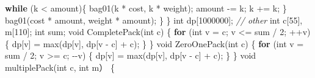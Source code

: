 \documentclass[
]{article}
\newenvironment{Shaded}{}{}
\newcommand{\CommentTok}[1]{\textcolor[rgb]{0.38,0.63,0.69}{\textit{#1}}}
\newcommand{\ControlFlowTok}[1]{\textcolor[rgb]{0.00,0.44,0.13}{\textbf{#1}}}
\newcommand{\DataTypeTok}[1]{\textcolor[rgb]{0.56,0.13,0.00}{#1}}
\newcommand{\DecValTok}[1]{\textcolor[rgb]{0.25,0.63,0.44}{#1}}
\newcommand{\NormalTok}[1]{#1}
\newcommand{\OperatorTok}[1]{\textcolor[rgb]{0.40,0.40,0.40}{#1}}
\begin{document}
\begin{Shaded}
\begin{Highlighting}[]
        \ControlFlowTok{while} \OperatorTok{(}\NormalTok{k }\OperatorTok{\textless{}}\NormalTok{ amount}\OperatorTok{)\{}  
\NormalTok{            bag01}\OperatorTok{(}\NormalTok{k }\OperatorTok{*}\NormalTok{ cost}\OperatorTok{,}\NormalTok{ k }\OperatorTok{*}\NormalTok{ weight}\OperatorTok{);}  
\NormalTok{            amount }\OperatorTok{{-}=}\NormalTok{ k}\OperatorTok{;}  
\NormalTok{            k }\OperatorTok{+=}\NormalTok{ k}\OperatorTok{;}  
        \OperatorTok{\}}  
\NormalTok{        bag01}\OperatorTok{(}\NormalTok{cost }\OperatorTok{*}\NormalTok{ amount}\OperatorTok{,}\NormalTok{ weight }\OperatorTok{*}\NormalTok{ amount}\OperatorTok{);}  
    \OperatorTok{\}}  
\OperatorTok{\}}  
\DataTypeTok{int}\NormalTok{ dp}\OperatorTok{[}\DecValTok{1000000}\OperatorTok{];} \CommentTok{// other}
\DataTypeTok{int}\NormalTok{ c}\OperatorTok{[}\DecValTok{55}\OperatorTok{],}\NormalTok{ m}\OperatorTok{[}\DecValTok{110}\OperatorTok{];}
\DataTypeTok{int}\NormalTok{ sum}\OperatorTok{;}
\DataTypeTok{void}\NormalTok{ CompletePack}\OperatorTok{(}\DataTypeTok{int}\NormalTok{ c}\OperatorTok{)} \OperatorTok{\{}
    \ControlFlowTok{for} \OperatorTok{(}\DataTypeTok{int}\NormalTok{ v }\OperatorTok{=}\NormalTok{ c}\OperatorTok{;}\NormalTok{ v }\OperatorTok{\textless{}=}\NormalTok{ sum }\OperatorTok{/} \DecValTok{2}\OperatorTok{;} \OperatorTok{++}\NormalTok{v}\OperatorTok{)\{}
\NormalTok{        dp}\OperatorTok{[}\NormalTok{v}\OperatorTok{]} \OperatorTok{=}\NormalTok{ max}\OperatorTok{(}\NormalTok{dp}\OperatorTok{[}\NormalTok{v}\OperatorTok{],}\NormalTok{ dp}\OperatorTok{[}\NormalTok{v }\OperatorTok{{-}}\NormalTok{ c}\OperatorTok{]} \OperatorTok{+}\NormalTok{ c}\OperatorTok{);}
    \OperatorTok{\}}
\OperatorTok{\}}
\DataTypeTok{void}\NormalTok{ ZeroOnePack}\OperatorTok{(}\DataTypeTok{int}\NormalTok{ c}\OperatorTok{)} \OperatorTok{\{}
    \ControlFlowTok{for} \OperatorTok{(}\DataTypeTok{int}\NormalTok{ v }\OperatorTok{=}\NormalTok{ sum }\OperatorTok{/} \DecValTok{2}\OperatorTok{;}\NormalTok{ v }\OperatorTok{\textgreater{}=}\NormalTok{ c}\OperatorTok{;} \OperatorTok{{-}{-}}\NormalTok{v}\OperatorTok{)} \OperatorTok{\{}
\NormalTok{        dp}\OperatorTok{[}\NormalTok{v}\OperatorTok{]} \OperatorTok{=}\NormalTok{ max}\OperatorTok{(}\NormalTok{dp}\OperatorTok{[}\NormalTok{v}\OperatorTok{],}\NormalTok{ dp}\OperatorTok{[}\NormalTok{v }\OperatorTok{{-}}\NormalTok{ c}\OperatorTok{]} \OperatorTok{+}\NormalTok{ c}\OperatorTok{);}
    \OperatorTok{\}}
\OperatorTok{\}}
\DataTypeTok{void}\NormalTok{ multiplePack}\OperatorTok{(}\DataTypeTok{int}\NormalTok{ c}\OperatorTok{,} \DataTypeTok{int}\NormalTok{ m） }\OperatorTok{\{}

\end{Highlighting}
\end{Shaded}
\end{document}
